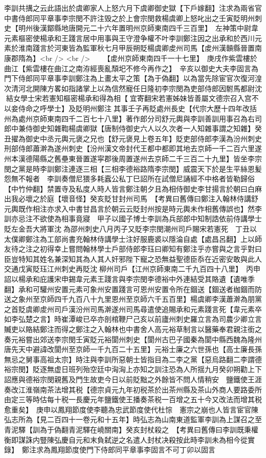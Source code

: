 李訓共搆之云此語出於虞卿家人上怒六月下虞卿御史獄【下戶嫁翻】注求為兩省官中書侍郎同平章事李宗閔不許注毁之於上會宗閔救楊虞卿上怒叱出之壬寅貶明州刺史【明州後漢鄮縣地唐開元二十六年置明州京師東南四千三百里】　左神策中尉韋元素樞密使楊承和王踐言居中用事與王守澄争權不叶李訓鄭注因之出承和於西川元素於淮南踐言於河東皆為監軍秋七月甲辰朔貶楊虞卿䖍州司馬【䖍州漢贑縣晉置南康郡隋為】<br />
<br />
　　【䖍州京師東南四千一十七里】　庚戌作紫雲樓於曲江【紫雲樓在曲江之南洊經喪亂頹圯不修今再作之】　辛亥以御史大夫李固言為門下侍郎同平章事李訓鄭注為上畫太平之策【為于偽翻】以為當先除宦官次復河湟次清河北開陳方畧如指諸掌上以為信然寵任日隆初李宗閔為吏部侍郎因駙馬都尉沈結女學士宋若憲知樞密楊承和得為相【宜寄翻宋若憲姊妹皆善屬文德宗召入宫不以妾侍命之呼學士】及貶明州鄭注其事壬子再貶處州長史【代宗大歷十四年改括州為處州京師東南四千二百七十八里】著作郎分司舒元輿與李訓善訓用事召為右司郎中兼侍御史知雜鞫楊虞卿獄【唐制侍御史六人以久次者一人知雜事謂之知雜】癸丑擢為御史中丞元輿元褒之兄也【舒元褒見上卷五年】貶吏部侍郎李漢為汾州刺史刑部侍郎蕭澣為遂州刺史【汾州漢文帝封代王都中都即其地去京師一千二百六里遂州本漢德陽縣之舊壘東晉置遂寜郡後周置遂州去京師二千三百二十九里】皆坐李宗閔之黨是時李訓鄭注連逐三相【三相李德裕路隋李宗閔】威震天下於是生平絲恩髪怨無不報者　李訓奏僧尼猥多耗蠧公私丁巳詔所在試僧尼誦經不中格者皆勒歸俗【中竹仲翻】禁置寺及私度人時人皆言鄭注朝夕且為相侍御史李甘揚言於朝曰白麻出我必壞之於庭【壞音怪】癸亥貶甘封州司馬　【考異曰舊傳曰鄭注入翰林侍講舒元輿既作相注亦求入中書甘昌言於朝云云貶封州按是時元輿未作相舊傳誤也】然李訓亦忌注不欲使為相事竟寢　甲子以國子博士李訓為兵部郎中知制誥依前侍講學士　貶左金吾大將軍沈為邵州刺史八月丙子又貶李宗閔潮州司戶賜宋若憲死　丁丑以太僕卿鄭注為工部尚書充翰林侍講學士注好服鹿裘以隱淪自處【處昌呂翻】上以師友待之注之初得幸上嘗問翰林學士戶部侍郎李珏曰卿知有鄭注乎亦嘗與之言乎對曰臣豈特知其姓名兼深知其為人其人奸邪陛下寵之恐無益聖德臣忝在近密安敢與此人交通戊寅貶珏江州刺史再貶沈柳州司戶【江州京師東南二千九百四十八里】　丙申詔以楊承和庇護宋申錫韋元素王踐言與李宗閔李德裕中外連結受其賂遺【遺唯季翻】承和可驩州安置元素可象州安置踐言可恩州安置令所在錮送【錮送者枷錮而防送之象州至京師四千九百八十九里恩州至京師六千五百里】楊虞卿李漢蕭澣為朋黨之首貶虞卿䖍州司戶漢汾州司馬澣遂州司馬尋遣使追賜承和元素踐言死【韋元素卒如李弘楚之言】時崔潭峻已卒亦剖棺鞭尸己亥以前廬州刺史羅立言為司農少卿立言贓吏以賂結鄭注而得之鄭注之入翰林也中書舍人高元裕草制言以醫藥奉君親注銜之奏元裕嘗出郊送李宗閔壬寅貶元裕閬州刺史【閬州古巴子國秦為閬中縣西魏為隆州唐先天中避諱改閬州至京師一千九百二十五里】元裕士廉之六世孫也【高士廉長孫無忌之舅事高祖太宗】時注與李訓所惡朝士皆指目為二李之黨【惡烏路翻二李謂德裕宗閔】貶逐無虚日班列殆空廷中洶洶上亦知之訓注恐為人所揺九月癸卯朔勸上下詔應與德裕宗閔親舊及門生故吏今日以前貶黜之外餘皆不問人情稍安　鹽鐵使王涯奏改江淮嶺南茶法增其税【德宗貞元九年初税茶於出茶州縣及茶山外商人要路委所由定三等時估每十税一長慶元年鹽鐵使王播奏茶税一百增之五十今又改法而增其税愈重矣】　庚申以鳳翔節度使李聽為忠武節度使代杜悰　憲宗之崩也人皆言宦官陳弘志所為【見二百四十一卷元和十五年】時弘志為山南東道監軍李訓為上謀召之至青泥驛【訓為于偽翻青泥驛在嶢關南】癸亥封杖殺之　【考異曰舊傳曰李訓既秉權衡即謀誅内豎陳弘慶自元和末負弑逆之名遣人封杖决殺按此時李訓未為相今從實錄】　鄭注求為鳳翔節度使門下侍郎同平章事李固言不可丁卯以固言